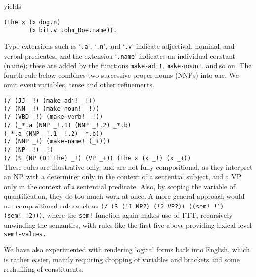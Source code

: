 \documentclass[a4,11pt]{article}
\begin{document}
\normalsize
\noindent yields \\
\small
\begin{verbatim}
(the x (x dog.n) 
       (x bit.v John_Doe.name)).
\end{verbatim}

\normalsize
Type-extensions such as `\texttt{.a}', `\texttt{.n}', and `\texttt{.v}' indicate adjectival, nominal, and verbal predicates, and the extension `\texttt{.name}' indicates an individual constant (name); these are added by the functions \texttt{make-adj!}, \texttt{make-noun!}, and so on. The fourth rule below combines two successive proper nouns (NNPs) into one. We omit event variables, tense and other refinements.

\small
\noindent \texttt{(/ (JJ \_!) (make-adj!~\_!))}\\
\texttt{(/ (NN \_!) (make-noun!~\_!))}\\
\texttt{(/ (VBD \_!) (make-verb!~\_!))}\\
\texttt{(/ (\_*.a (NNP \_!.1) (NNP \_!.2) \_*.b)}\\
\hspace*{2em}\texttt{(\_*.a (NNP \_!.1 \_!.2) \_*.b))}\\
\texttt{(/ (NNP \_+) (make-name!~(\_+)))}\\
\texttt{(/ (NP \_!) \_!)}\\
\texttt{(/ (S (NP (DT the) \_!) (VP \_+)) (the x (x \_!) (x \_+))}\\

\normalsize
These rules are illustrative only, and are not fully compositional, as they interpret an NP with a determiner only in the context of a sentential subject, and a VP only in the context of a sentential predicate. Also, by scoping the variable of quantification, they do too much work at once. A more general approach would use compositional rules such as {\small\tt (/ (S (!1 NP?) (!2 VP?)) ((sem!~!1) (sem!~!2)))}, where the {\small\tt sem!} function again makes use of TTT, recursively unwinding the semantics, with rules like the first five above providing lexical-level {\small\tt {sem!}-values.}

We have also experimented with rendering logical forms back into English, which is rather easier, mainly requiring dropping of variables and brackets and some reshuffling of constituents.
\end{document}
